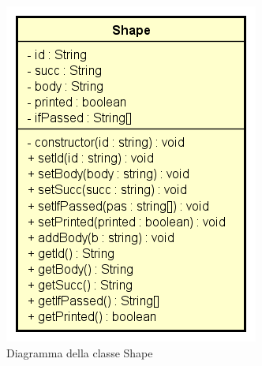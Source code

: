 \begin{figure}[h!]
	\centering
	\includegraphics[scale=0.8]{res/sections/SpecificaFrontEnd/Services/Disegnetti/shape.png}
	\caption{Diagramma della classe Shape}
\end{figure}

